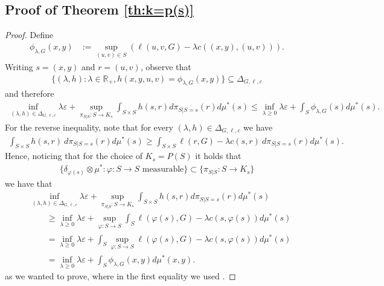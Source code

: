 \documentclass{article}
\newcommand{\R}{\mathbb{R}} %
\newcommand{\D}{\Delta_{G,\ell, c}}
\newcommand{\phifix}{\phi_{\lambda, G}}
\theoremstyle{definition}
\theoremstyle{remarksty}
\begin{document}
\subsection{Proof of Theorem \ref{th:k=p(s)}}\label{supp:p(s)-duality-proof}
\begin{proof}
Define
\begin{align}
\phifix (x,y) &:= \sup_{(u,v) \in S} (\ell(u,v,G) - \lambda c((x,y),(u,v))).
\end{align}
    Writing $s=(x,y)$ and $r=(u,v)$, observe that
    \begin{align*}
        \{(\lambda, h): \lambda \in \R_+, h(x,y,u,v) = \phifix(x,y)\} \subseteq \D
    \end{align*}
    and therefore 
    \begin{align*}
        \inf_{(\lambda, h) \in \D} \lambda \varepsilon + \sup_{\pi_{S|S} : S \rightarrow K_s} \int_{S \times S} h(s,r) d\pi_{S|S=s}(r)d\mu^*(s) \leq \inf_{\lambda \geq 0} \lambda \varepsilon +  \int_{S} \phifix(s) d\mu^*(s).
    \end{align*}
    For the reverse inequality, note that for every $(\lambda, h) \in \D$ we have
    \begin{align*}
        \int_{S\times S} h(s,r)\ d\pi_{S|S=s}(r)d\mu^*(s) \geq \int_{S\times S} \ell(r,G)-\lambda c(s,r)\ d\pi_{S|S=s}(r)d\mu^*(s).
    \end{align*}
    Hence, noticing that for the choice of $K_s = P(S)$ it holds that 
    \begin{align*}
    \{ \delta_{\varphi(s)} \otimes \mu^* : \varphi :S \rightarrow S \text{ measurable}\} \subset \{\pi_{S|S} : S \rightarrow K_s\}
    \end{align*}
    we have that
    \begin{align*}
        &\inf_{(\lambda, h) \in \D} \lambda \varepsilon + \sup_{\pi_{S|S} : S \rightarrow K_s} \int_{S \times S} h(s,r) d\pi_{S|S=s}(r) d\mu^*(s)  \\
        &\qquad\geq \inf_{\lambda \geq 0} \lambda \varepsilon +  \sup_{\varphi : S\rightarrow S} \int_S  \ell(\varphi(s),G) - \lambda c(s,\varphi(s))d\mu^*(s) \\
        &\qquad = \inf_{\lambda \geq 0} \lambda \varepsilon +  \int_S \sup_{\varphi : S\rightarrow S} \ell( \varphi(s),G) - \lambda c(s, \varphi(s)) d\mu^*(s)  \\
        &\qquad= \inf_{\lambda \geq 0} \lambda \varepsilon + \int_S \phifix (x,y) d\mu^*(x,y).
    \end{align*}
    as we wanted to prove,
    where in the first equality we used \cite[Theorem 3A]{rockafellar_integral_1976}.
\end{proof}
\end{document}
